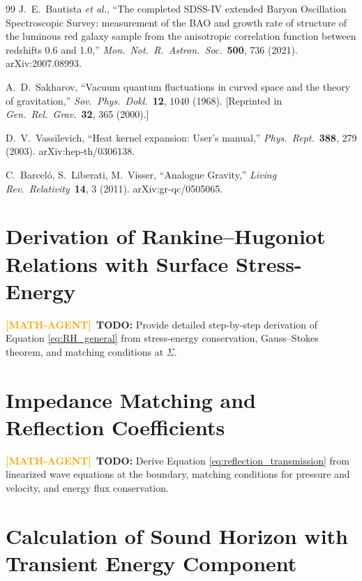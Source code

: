 \documentclass[11pt,a4paper]{article}
\theoremstyle{definition}
\newcommand{\MATHAGENT}{\textcolor{orange}{\textbf{[MATH-AGENT]}}}
\begin{document}
\begin{thebibliography}{99}
J.~E.~Bautista \emph{et al.}, ``The completed SDSS-IV extended Baryon Oscillation Spectroscopic Survey: measurement of the BAO and growth rate of structure of the luminous red galaxy sample from the anisotropic correlation function between redshifts 0.6 and 1.0,'' \emph{Mon.\ Not.\ R.\ Astron.\ Soc.}\ \textbf{500}, 736 (2021). arXiv:2007.08993.

A.~D.~Sakharov, ``Vacuum quantum fluctuations in curved space and the theory of gravitation,'' \emph{Sov.\ Phys.\ Dokl.}\ \textbf{12}, 1040 (1968). [Reprinted in \emph{Gen.\ Rel.\ Grav.}\ \textbf{32}, 365 (2000).]

D.~V.~Vassilevich, ``Heat kernel expansion: User's manual,'' \emph{Phys.\ Rept.}\ \textbf{388}, 279 (2003). arXiv:hep-th/0306138.

C.~Barceló, S.~Liberati, M.~Visser, ``Analogue Gravity,'' \emph{Living Rev.\ Relativity}\ \textbf{14}, 3 (2011). arXiv:gr-qc/0505065.

\end{thebibliography}

\newpage
\appendix

\section{Derivation of Rankine--Hugoniot Relations with Surface Stress-Energy}
\label{app:RH_derivation}

\MATHAGENT~\textbf{TODO:} Provide detailed step-by-step derivation of Equation \eqref{eq:RH_general} from stress-energy conservation, Gauss--Stokes theorem, and matching conditions at $\Sigma$.

\section{Impedance Matching and Reflection Coefficients}
\label{app:impedance}

\MATHAGENT~\textbf{TODO:} Derive Equation \eqref{eq:reflection_transmission} from linearized wave equations at the boundary, matching conditions for pressure and velocity, and energy flux conservation.

\section{Calculation of Sound Horizon with Transient Energy Component}
\label{app:sound_horizon}
\end{document}
